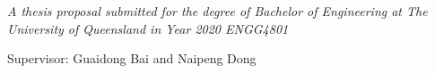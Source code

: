 \nocite{*} %

\maketitle

\vspace{350 pt}

\begin{center}
  \large{\textit{
  A thesis proposal submitted for the degree of Bachelor of Engineering at The University of Queensland in Year 2020
  ENGG4801}}
\end{center}

\vspace{50 pt}

Supervisor: Guaidong Bai and Naipeng Dong

\thispagestyle{empty}

\newpage


\tableofcontents




\newpage


\setcounter{page}{1}